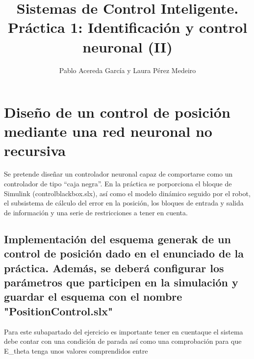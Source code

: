 \documentclass[12pt]{article}
\begin{document}
     
\sloppy

\title{Sistemas de Control Inteligente. \newline Práctica 1: Identificación y control neuronal (II)}

\author{Pablo Acereda García y Laura Pérez Medeiro}


\maketitle



\section{Diseño de un control de posición mediante una red neuronal no recursiva}
\mbox{}
Se pretende diseñar un controlador neuronal capaz de comportarse como un controlador de tipo “caja negra”.
En la práctica se porporciona el bloque de Simulink (controlblackbox.slx), así como el modelo dinámico seguido por el robot, el subsistema de cálculo del error en la posición, los bloques de entrada y salida de información y una serie de restricciones a tener en cuenta.  

\subsection{Implementación del esquema generak de un control de posición dado en el enunciado de la práctica. Además, se deberá configurar los parámetros que participen en la simulación y guardar el esquema con el nombre "PositionControl.slx"}

Para este subapartado del ejercicio es importante tener en cuentaque el sistema debe contar con una condición de parada así como una comprobación para que E\_theta tenga unos valores comprendidos entre %
\end{document}
